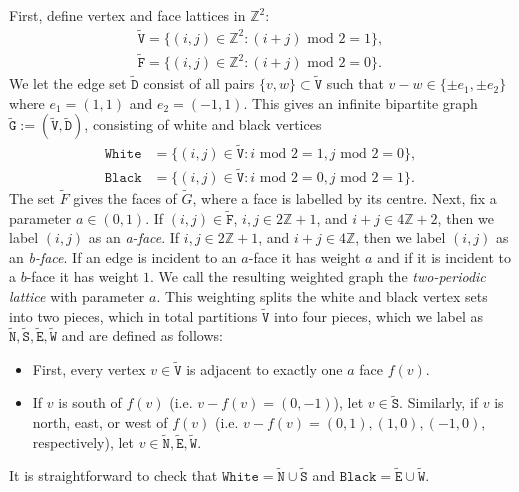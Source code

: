 \documentclass[11pt,twoside]{amsart}
\theoremstyle{plain}
\numberwithin{quest}{section}
\theoremstyle{remark}
\numberwithin{rem}{section}
\theoremstyle{definition}
\newcommand{\Z}{\mathbb{Z}}
\renewcommand{\tt}[1]{{\mathtt{#1}}}
\begin{document}
	First, define vertex and face lattices in $\Z^2$:
	\begin{align*}
		\tt{\tilde V} = \{(i, j) \in \Z^2 : (i+j)\text{ mod } 2=1\}, \\
		\tt{\tilde F} = \{(i, j) \in \Z^2 : (i+j)\text{ mod } 2=0\}.
	\end{align*}
	We let the edge set $\tt{\tilde D}$ consist of all pairs $\{v, w\} \subset \tt{\tilde V}$ such that $v-w \in \{\pm e_1, \pm e_2\}$ where $e_1=(1,1)$ and $e_2=(-1,1)$. This gives an infinite bipartite graph $\tt{\tilde G} := (\tt{\tilde V}, \tt{\tilde D})$, consisting of white and black vertices
	\begin{align*}
		\tt{White} &= \{(i, j) \in \tt{\tilde V} : i\text{ mod } 2=1, j\text{ mod } 2=0\}, \\
		\tt{Black} &= \{(i, j) \in \tt{\tilde V} : i\text{ mod } 2 =0, j\text{ mod } 2=1\}.
	\end{align*}
	The set $\tilde{F}$ gives the faces of $\tilde{G}$, where a face is labelled by its centre. Next, fix a parameter $a \in (0, 1)$. If $(i,j) \in \tt{\tilde F}$, $i, j \in 2 \Z + 1$, and $i + j \in 4 \Z + 2$, then we label $(i,j)$ as an \emph{a-face}. If $i, j \in 2 \Z + 1$, and $i + j \in 4 \Z$, then we label $(i,j)$ as an \emph{b-face}. If an edge is incident to an $a$-face it has weight $a$ and if it is incident to a $b$-face it has weight $1$. We call the resulting weighted graph the \emph{two-periodic lattice} with parameter $a$. This weighting splits the white and black vertex sets into two pieces, which in total partitions $\tt{\tilde V}$ into four pieces, which we label as $\tt{\tilde N}, \tt{\tilde S}, \tt{\tilde E}, \tt{\tilde W}$ and are defined as follows:
	\begin{itemize}[nosep]
		\item First, every vertex $v \in \tt{\tilde V}$ is adjacent to exactly one $a$ face $f(v)$.
		\item If $v$ is south of $f(v)$ (i.e. $v - f(v) = (0, -1)$), let $v \in \tt{\tilde S}$. Similarly, if $v$ is north, east, or west of $f(v)$ (i.e. $v - f(v) = (0, 1), (1, 0), (-1, 0)$, respectively), let $v \in \tt{\tilde N}, \tt{\tilde E}, \tt{\tilde W}$. 
	\end{itemize}
	It is straightforward to check that $\tt{White} = \tt{\tilde N} \cup \tt{\tilde S}$ and $\tt{Black} = \tt{\tilde E} \cup \tt{\tilde W}$. 
	
\end{document}
